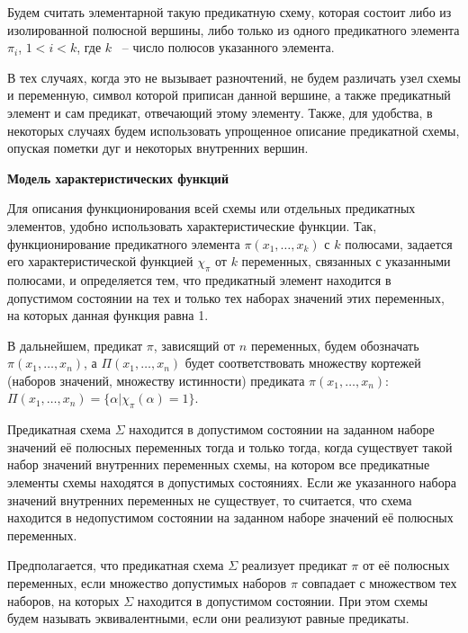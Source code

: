 \documentclass[12pt]{article}
\newenvironment{definition}[1][Определение]{\begin{trivlist}
\item[\hskip \labelsep {\bfseries #1}]}{\end{trivlist}}
\begin{document}
Будем считать элементарной такую предикатную схему, которая состоит либо из изолированной полюсной вершины, 
либо только из одного предикатного элемента $\pi_i$, $1 < i < k$, где $k$ ~-- число полюсов указанного элемента.

В тех случаях, когда это не вызывает разночтений, 
не будем различать узел схемы и переменную, 
символ которой приписан данной вершине, а также предикатный элемент и сам предикат, отвечающий этому элементу. 
Также, для удобства, в некоторых случаях будем использовать упрощенное описание предикатной схемы, 
опуская пометки дуг и некоторых внутренних вершин. 

\textbf{Модель характеристических функций}

Для описания функционирования всей схемы или отдельных предикатных элементов, удобно использовать характеристические
функции. Так, функционирование предикатного элемента $\pi(x_1, \dots, x_k)$ с $k$ полюсами,
задается его характеристической функцией $\chi_{\pi}$ от $k$ переменных, 
связанных с указанными полюсами, и определяется тем, что предикатный элемент находится в допустимом состоянии на тех и 
только тех наборах значений этих переменных, на которых данная функция равна 1. 

В дальнейшем, предикат $\pi$, зависящий от $n$ переменных, будем обозначать $\pi(x_1, \dots, x_n)$, а 
$\Pi(x_1, \dots, x_n)$ будет соответствовать множеству кортежей (наборов значений, множеству истинности) 
предиката $\pi(x_1, \dots, x_n)$: $\Pi(x_1, \dots, x_n) = \{ \alpha | \chi_{\pi}(\alpha) = 1 \}$. 

\begin{definition}
Предикатная схема $\Sigma$ находится в допустимом состоянии на заданном наборе значений её полюсных переменных тогда и только тогда, 
когда существует такой набор значений внутренних переменных схемы, на котором все предикатные элементы схемы находятся в допустимых состояниях. 
Если же указанного набора значений внутренних переменных не существует, то считается, что схема находится в недопустимом состоянии на 
заданном наборе значений её полюсных переменных.
\end{definition}

\begin{definition}
Предполагается, что предикатная схема $\Sigma$ реализует предикат $\pi$ от её полюсных переменных, 
если множество допустимых наборов $\pi$ 
совпадает с множеством тех наборов, на которых $\Sigma$ находится в допустимом состоянии. 
При этом схемы будем называть эквивалентными, если они реализуют равные предикаты. 
\end{definition}
\end{document}
